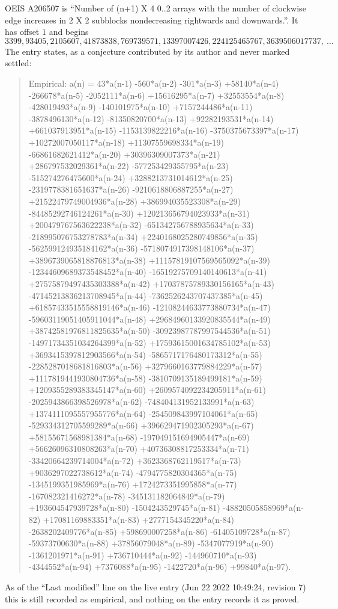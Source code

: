 \documentclass[11pt,a4paper]{article}
\theoremstyle{plain}
\theoremstyle{definition}
\begin{document}
OEIS A206507 is ``Number of (n+1) X 4 0..2 arrays with the number of clockwise edge increases in 2 X 2 subblocks nondecreasing rightwards and downwards.''. It has offset $1$ and begins
\[
3399, 93405, 2105607, 41873838, 769739571, 13397007426, 224125465767, 3639506017737,\ \dots
\]
The entry states, as a conjecture contributed by its author and never marked settled:
\begin{quote}
Empirical: a(n) = 43*a(n-1) -560*a(n-2) -301*a(n-3) +58140*a(n-4) -266678*a(n-5) -2052111*a(n-6) +15616295*a(n-7) +32553554*a(n-8) -428019493*a(n-9) -140101975*a(n-10) +7157244486*a(n-11) -3878496130*a(n-12) -81350820700*a(n-13) +92282193531*a(n-14) +661037913951*a(n-15) -1153139822216*a(n-16) -3750375673397*a(n-17) +10272007050117*a(n-18) +11307559698334*a(n-19) -66861682621412*a(n-20) +30396309007373*a(n-21) +286797532029361*a(n-22) -577253429355795*a(n-23) -515274276475600*a(n-24) +3288213731014612*a(n-25) -2319778381651637*a(n-26) -9210618806887255*a(n-27) +21522479749004936*a(n-28) +386994035523308*a(n-29) -84485292746124261*a(n-30) +120213656794023933*a(n-31) +200479767563622238*a(n-32) -651342756788935634*a(n-33) -218995076753278783*a(n-34) +2240168025280749856*a(n-35) -562599124935184162*a(n-36) -5718074917398148106*a(n-37) +3896739065818876813*a(n-38) +11157819107569565092*a(n-39) -12344609689373548452*a(n-40) -16519275709140140613*a(n-41) +27575879497435303388*a(n-42) +17037875789330156165*a(n-43) -47145213836213708945*a(n-44) -7362526243707437385*a(n-45) +61857433515558819146*a(n-46) -12108244633773880734*a(n-47) -59603119051405911044*a(n-48) +29684960133920835544*a(n-49) +38742581976811825635*a(n-50) -30923987787997544536*a(n-51) -14971734351034264399*a(n-52) +17593615001634785102*a(n-53) +3693415397812903566*a(n-54) -5865717176480173312*a(n-55) -2285287018681816803*a(n-56) +3279660163779884229*a(n-57) +1117819441930804736*a(n-58) -3810709135189499181*a(n-59) +1209355289383345147*a(n-60) +2609574092234205911*a(n-61) -2025943866398526978*a(n-62) -748404131952133991*a(n-63) +1374111095557955776*a(n-64) -254509843997104061*a(n-65) -529334312705599289*a(n-66) +396629471902305293*a(n-67) +58155671568981384*a(n-68) -197049151694905447*a(n-69) +56626096310808263*a(n-70) +40736308817253334*a(n-71) -33420664239714004*a(n-72) +3623368762119517*a(n-73) +9036297022738612*a(n-74) -4794775820304365*a(n-75) -1345199351985969*a(n-76) +1724273351995858*a(n-77) -167082321416272*a(n-78) -345131182064849*a(n-79) +193604547939728*a(n-80) -1504243529745*a(n-81) -48820505858969*a(n-82) +17081169883351*a(n-83) +2777154345220*a(n-84) -2638202409776*a(n-85) +598690007258*a(n-86) -61405109728*a(n-87) -59373700630*a(n-88) +37856079048*a(n-89) -5347077919*a(n-90) -1361201971*a(n-91) +736710444*a(n-92) -144960710*a(n-93) -4344552*a(n-94) +7376088*a(n-95) -1422720*a(n-96) +99840*a(n-97).
\end{quote}
As of the ``Last modified'' line on the live entry (Jun 22 2022 10:49:24, revision 7) this is still
recorded as empirical, and nothing on the entry records it as proved.
\end{document}
